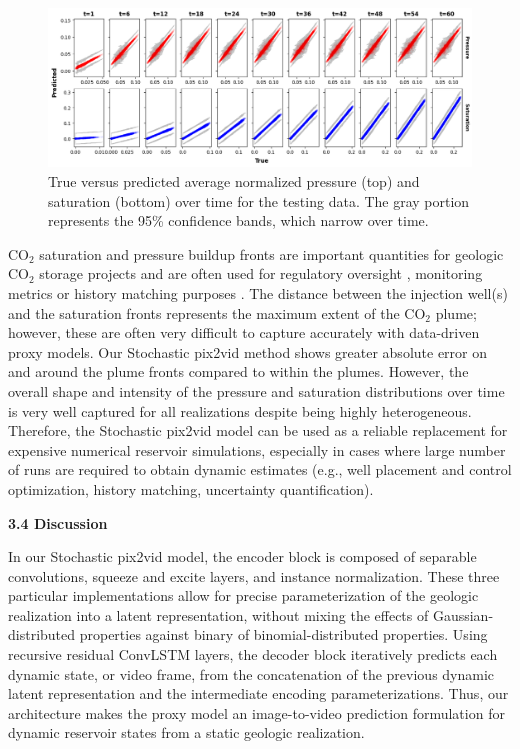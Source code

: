\documentclass[10pt, twoside]{article}
\begin{document}
\begin{figure}
    \centering
    \includegraphics[width=\textwidth]{figures/r2ci.png}
    \caption{True versus predicted average normalized pressure (top) and saturation (bottom) over time for the testing data. The gray portion represents the 95\% confidence bands, which narrow over time.}
    \label{r2ci}
\end{figure}

CO$_2$ saturation and pressure buildup fronts are important quantities for geologic CO$_2$ storage projects and are often used for regulatory oversight \cite{Li2016249, Chadwick20051385}, monitoring metrics or history matching purposes \cite{Chadwick20101171, dawuda2022geologic}. The distance between the injection well(s) and the saturation fronts represents the maximum extent of the CO$_2$ plume; however, these are often very difficult to capture accurately with data-driven proxy models. Our Stochastic pix2vid method shows greater absolute error on and around the plume fronts compared to within the plumes. However, the overall shape and intensity of the pressure and saturation distributions over time is very well captured for all realizations despite being highly heterogeneous. Therefore, the Stochastic pix2vid model can be used as a reliable replacement for expensive numerical reservoir simulations, especially in cases where large number of runs are required to obtain dynamic estimates (e.g., well placement and control optimization, history matching, uncertainty quantification).

\textbf{3.4 Discussion}

In our Stochastic pix2vid model, the encoder block is composed of separable convolutions, squeeze and excite layers, and instance normalization. These three particular implementations allow for precise parameterization of the geologic realization into a latent representation, without mixing the effects of Gaussian-distributed properties against binary of binomial-distributed properties. Using recursive residual ConvLSTM layers, the decoder block iteratively predicts each dynamic state, or video frame, from the concatenation of the previous dynamic latent representation and the intermediate encoding parameterizations. Thus, our architecture makes the proxy model an image-to-video prediction formulation for dynamic reservoir states from a static geologic realization.
\end{document}
